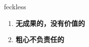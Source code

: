 
\begin{frame}
{\huge feckless}
\begin{center}
\begin{enumerate}\Large
  \item \textbf{无成果的，没有价值的}
  \item \textbf{粗心不负责任的}
\end{enumerate}
\end{center}
\end{frame}
